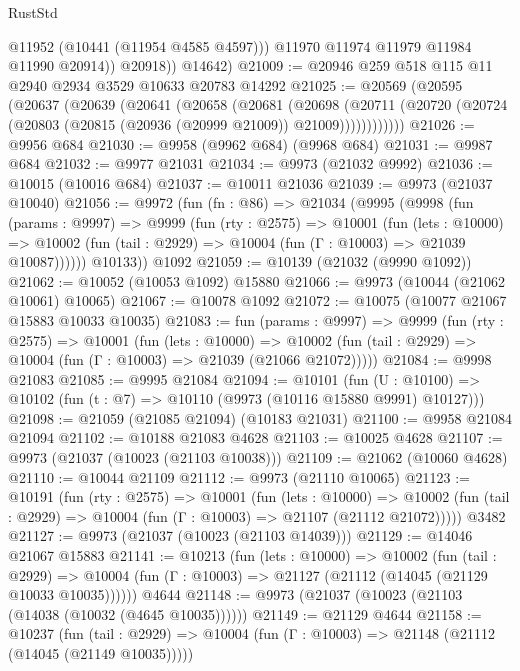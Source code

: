 \begin{lexlean}{RustStd}
\begin{coremodule}
                @11952
                (@10441 (@11954 @4585 @4597)))
              @11970
              @11974
              @11979
              @11984
              @11990
              @20914))
          @20918))
      @14642)
@21009 := @20946 @259 @518 @115 @11 @2940 @2934 @3529 @10633 @20783 @14292
@21025 := @20569
    (@20595
      (@20637
        (@20639
          (@20641
            (@20658
              (@20681
                (@20698
                  (@20711
                    (@20720 (@20724 (@20803 (@20815 (@20936 (@20999 @21009)) @21009))))))))))))
@21026 := @9956 @684
@21030 := @9958 (@9962 @684) (@9968 @684)
@21031 := @9987 @684
@21032 := @9977 @21031
@21034 := @9973 (@21032 @9992)
@21036 := @10015 (@10016 @684)
@21037 := @10011 @21036
@21039 := @9973 (@21037 @10040)
@21056 := @9972
    (fun (fn : @86) =>
    @21034
      (@9995
        (@9998
          (fun (params : @9997) =>
          @9999
            (fun (rty : @2575) =>
            @10001
              (fun (lets : @10000) =>
              @10002 (fun (tail : @2929) => @10004 (fun (Γ : @10003) => @21039 @10087))))))
        @10133))
    @1092
@21059 := @10139 (@21032 (@9990 @1092))
@21062 := @10052 (@10053 @1092) @15880
@21066 := @9973 (@10044 (@21062 @10061) @10065)
@21067 := @10078 @1092
@21072 := @10075 (@10077 @21067 @15883 @10033 @10035)
@21083 := fun (params : @9997) =>
  @9999
    (fun (rty : @2575) =>
    @10001
      (fun (lets : @10000) =>
      @10002 (fun (tail : @2929) => @10004 (fun (Γ : @10003) => @21039 (@21066 @21072)))))
@21084 := @9998 @21083
@21085 := @9995 @21084
@21094 := @10101
    (fun (U : @10100) => @10102 (fun (t : @7) => @10110 (@9973 (@10116 @15880 @9991) @10127)))
@21098 := @21059 (@21085 @21094) (@10183 @21031)
@21100 := @9958 @21084 @21094
@21102 := @10188 @21083 @4628
@21103 := @10025 @4628
@21107 := @9973 (@21037 (@10023 (@21103 @10038)))
@21109 := @21062 (@10060 @4628)
@21110 := @10044 @21109
@21112 := @9973 (@21110 @10065)
@21123 := @10191
    (fun (rty : @2575) =>
    @10001
      (fun (lets : @10000) =>
      @10002 (fun (tail : @2929) => @10004 (fun (Γ : @10003) => @21107 (@21112 @21072)))))
    @3482
@21127 := @9973 (@21037 (@10023 (@21103 @14039)))
@21129 := @14046 @21067 @15883
@21141 := @10213
    (fun (lets : @10000) =>
    @10002
      (fun (tail : @2929) =>
      @10004 (fun (Γ : @10003) => @21127 (@21112 (@14045 (@21129 @10033 @10035))))))
    @4644
@21148 := @9973 (@21037 (@10023 (@21103 (@14038 (@10032 (@4645 @10035))))))
@21149 := @21129 @4644
@21158 := @10237
    (fun (tail : @2929) => @10004 (fun (Γ : @10003) => @21148 (@21112 (@14045 (@21149 @10035)))))

\end{coremodule}
\end{lexlean}
